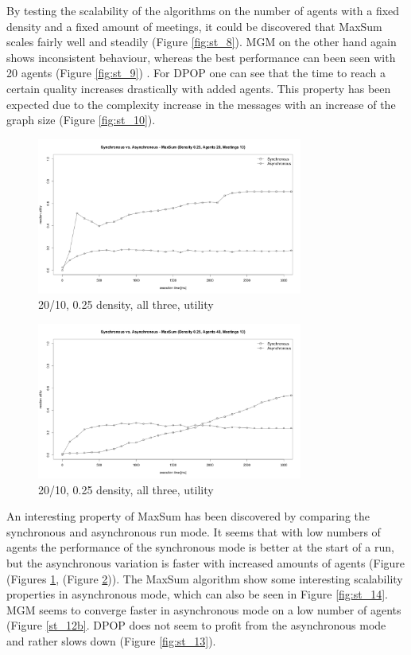 By testing the scalability of the algorithms on the number of agents with a fixed density and a fixed amount of meetings, it could be discovered that MaxSum scales fairly well and steadily (Figure \ref{fig:st_8}). MGM on the other hand again shows inconsistent behaviour, whereas the best performance can been seen with 20 agents (Figure \ref{fig:st_9}) . For DPOP one can see that the time  to reach a certain quality increases drastically with added agents. This property has been expected due to the complexity increase in the messages with an increase of the graph size (Figure \ref{fig:st_10}).
\begin{figure}[H]
\centering
\includegraphics[width=330px]{graphics/experiments/static/st_11}
\caption{20/10, 0.25 density, all three, utility}
\label{fig:st_11}
\end{figure}
\begin{figure}[H]
\centering
\includegraphics[width=330px]{graphics/experiments/static/st_12}
\caption{20/10, 0.25 density, all three, utility}
\label{fig:st_12}
\end{figure}

An interesting property of MaxSum has been discovered by comparing the synchronous and asynchronous run mode. It seems that with low numbers of agents the performance of the synchronous mode is better at the start of a run, but the asynchronous variation is faster with increased amounts of agents (Figure (Figures \ref{fig:st_11}, (Figure \ref{fig:st_12})). The MaxSum algorithm show some interesting scalability properties in asynchronous mode, which can also be seen in Figure \ref{fig:st_14}. MGM seems to converge faster in asynchronous mode on a low number of agents (Figure \ref{st_12b}. DPOP does not seem to profit from the asynchronous mode and rather slows down (Figure \ref{fig:st_13}).

